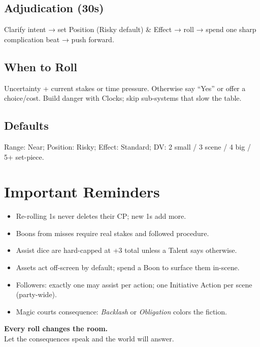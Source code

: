 \begin{multicols}{2}
\subsection*{Adjudication (30s)}
Clarify intent → set Position (Risky default) \& Effect → roll → spend one sharp complication beat → push forward.

\subsection*{When to Roll}
Uncertainty + current stakes or time pressure. Otherwise say “Yes” or offer a choice/cost. Build danger with Clocks; skip sub-systems that slow the table.

\subsection*{Defaults}
Range: Near; Position: Risky; Effect: Standard; DV: 2 small / 3 scene / 4 big / 5+ set-piece.

\section{Important Reminders}
\begin{itemize}
  \item Re-rolling 1s never deletes their CP; new 1s add more.
  \item Boons from misses require real stakes and followed procedure.
  \item Assist dice are hard-capped at +3 total unless a Talent says otherwise.
  \item Assets act off-screen by default; spend a Boon to surface them in-scene.
  \item Followers: exactly one may assist per action; one Initiative Action per scene (party-wide).
  \item Magic courts consequence: \emph{Backlash} or \emph{Obligation} colors the fiction.
\end{itemize}

\begin{center}\Large
\textbf{Every roll changes the room.}\\
Let the consequences speak and the world will answer.
\end{center}

\end{multicols}
